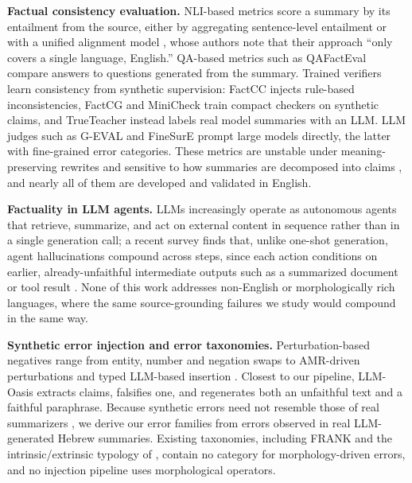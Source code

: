\documentclass[11pt]{article}
\begin{document}
\textbf{Factual consistency evaluation.}
NLI-based metrics score a summary by its entailment from the source, either by aggregating sentence-level entailment \citep{DBLP:journals/corr/abs-2111-09525} or with a unified alignment model \citep{zha-etal-2023-alignscore}, whose authors note that their approach ``only covers a single language, English.'' QA-based metrics such as QAFactEval \citep{fabbri-etal-2022-qafacteval} compare answers to questions generated from the summary. Trained verifiers learn consistency from synthetic supervision: FactCC \citep{kryscinskiFactCC2019} injects rule-based inconsistencies, FactCG \citep{lei-etal-2025-factcg} and MiniCheck \citep{tang-etal-2024-minicheck} train compact checkers on synthetic claims, and TrueTeacher \citep{gekhman-etal-2023-trueteacher} instead labels real model summaries with an LLM. LLM judges such as G-EVAL \citep{liu-etal-2023-g} and FineSurE \citep{song-etal-2024-finesure} prompt large models directly, the latter with fine-grained error categories. These metrics are unstable under meaning-preserving rewrites \citep{mujahid-etal-2026-stress} and sensitive to how summaries are decomposed into claims \citep{wanner-etal-2024-closer,hu2025decomposition}, and nearly all of them are developed and validated in English.

\textbf{Factuality in LLM agents.}
LLMs increasingly operate as autonomous agents that retrieve, summarize, and act on external content in sequence rather than in a single generation call; a recent survey finds that, unlike one-shot generation, agent hallucinations compound across steps, since each action conditions on earlier, already-unfaithful intermediate outputs such as a summarized document or tool result \citep{lin2025agenthallucination}. None of this work addresses non-English or morphologically rich languages, where the same source-grounding failures we study would compound in the same way.

\textbf{Synthetic error injection and error taxonomies.}
Perturbation-based negatives range from entity, number and negation swaps \citep{kryscinskiFactCC2019,cao-wang-2021-cliff} to AMR-driven perturbations \citep{qiu2024amrfact} and typed LLM-based insertion \citep{mishra2024fava}. Closest to our pipeline, LLM-Oasis \citep{scire-etal-2026-truth} extracts claims, falsifies one, and regenerates both an unfaithful text and a faithful paraphrase. Because synthetic errors need not resemble those of real summarizers \citep{goyal-durrett-2021-annotating,gekhman-etal-2023-trueteacher}, we derive our error families from errors observed in real LLM-generated Hebrew summaries. Existing taxonomies, including FRANK \citep{pagnoni-etal-2021-understanding} and the intrinsic/extrinsic typology of \citet{tang-etal-2023-understanding}, contain no category for morphology-driven errors, and no injection pipeline uses morphological operators.
\end{document}
